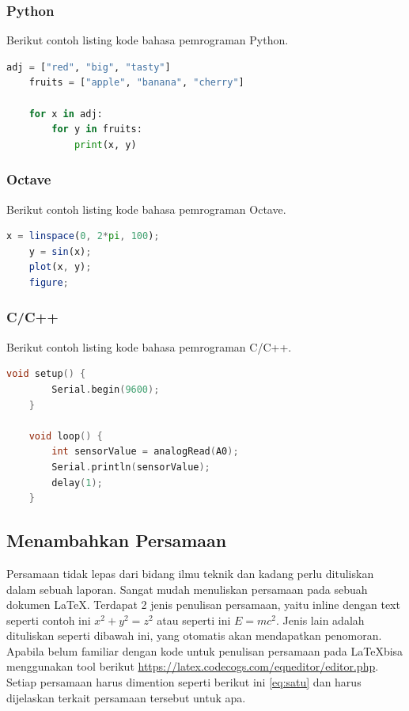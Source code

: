 \subsubsection{Python}
Berikut contoh listing kode bahasa pemrograman Python.
\begin{lstlisting}[language=python]
    adj = ["red", "big", "tasty"]
    fruits = ["apple", "banana", "cherry"]

    for x in adj:
        for y in fruits:
            print(x, y)
    \end{lstlisting}

\subsubsection{Octave}
Berikut contoh listing kode bahasa pemrograman Octave.
\begin{lstlisting}[language=octave]
    x = linspace(0, 2*pi, 100);
    y = sin(x);
    plot(x, y);
    figure;
    \end{lstlisting}

\subsubsection{C/C++}
Berikut contoh listing kode bahasa pemrograman C/C++.
\begin{lstlisting}[language=C]
    void setup() {
        Serial.begin(9600);
    }

    void loop() {
        int sensorValue = analogRead(A0);
        Serial.println(sensorValue);
        delay(1);
    }
    \end{lstlisting}

\subsection{Menambahkan Persamaan}
Persamaan tidak lepas dari bidang ilmu teknik dan kadang perlu dituliskan dalam sebuah laporan. Sangat mudah menuliskan persamaan pada sebuah dokumen \LaTeX. Terdapat 2 jenis penulisan persamaan, yaitu inline dengan text seperti contoh ini \(x^2 + y^2 = z^2\) atau seperti ini $E=mc^2$. Jenis lain adalah dituliskan seperti dibawah ini, yang otomatis akan mendapatkan penomoran. Apabila belum familiar dengan kode untuk penulisan persamaan pada \LaTeX bisa menggunakan tool berikut \url{https://latex.codecogs.com/eqneditor/editor.php}. Setiap persamaan harus dimention seperti berikut ini \cref{eq:satu} dan harus dijelaskan terkait persamaan tersebut untuk apa.

